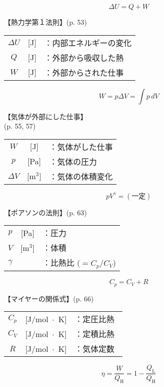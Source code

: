 \documentclass[10pt]{jarticle}
\begin{document}
\newpage
\[
	\mathit{\Delta} U = Q + W
\]


\vskip3mm
【熱力学第１法則】{\footnotesize (p. 53)}

\begin{tabular}{ccl}
$\mathit{\Delta} U$	&[J]	&：{\small 内部エネルギーの変化}\\
$Q$	&[J]	&：外部から吸収した熱\\
$W$	&[J]	&：外部からされた仕事
\end{tabular}





\newpage
\[
	W =  p \mathit{\Delta}V = \int \! \! p \, dV
\]


\vskip3mm
【気体が外部にした仕事】\\
\hfill {\footnotesize (p. 55, 57)}

\begin{tabular}{ccl}
$W$	&[J]	&：{\small 気体がした仕事}\\
$p$	&[Pa]	&：気体の圧力\\
$\mathit{\Delta} V$	&[m$^3$]	&：気体の体積変化
\end{tabular}





\newpage
\[
	pV^\gamma = (一定)
\]


\vskip3mm
【ポアソンの法則】{\footnotesize (p. 63)}

\begin{tabular}{ccl}
$p$	&[Pa]	&：圧力\\
$V$	&[m$^3$]	&：体積\\
$\gamma$	&	&：比熱比 ($= C_p / C_V$)
\end{tabular}




\newpage
\[
	C_p = C_V + R
\]


\vskip3mm
【マイヤーの関係式】{\footnotesize (p. 66)}

\begin{tabular}{ccl}
$C_p$	&[J/mol $\!\! \cdot \!\! $ K]	&：定圧比熱\\
$C_V$	&[J/mol $\!\! \cdot \!\! $ K]	&：定積比熱\\
$R$	&[J/mol $\!\! \cdot \!\! $ K]	&：気体定数\
\end{tabular}




\newpage
\[
	\eta = \frac{W}{Q_\mathrm{H}} = 1- \frac{Q_\mathrm{L}}{Q_\mathrm{H}}
\]
\end{document}
